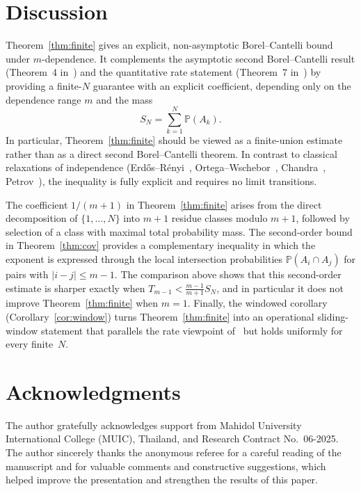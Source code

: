 \documentclass[11pt]{article}
\begin{document}
\section{Discussion}
Theorem~\ref{thm:finite} gives an explicit, non-asymptotic Borel--Cantelli
bound under $m$-dependence.  It complements the asymptotic second
Borel--Cantelli result (Theorem~4 in~\cite{LuShiZhao2026}) and the
quantitative rate statement (Theorem~7 in~\cite{LuShiZhao2026}) by
providing a finite-$N$ guarantee with an explicit coefficient,
depending only on the dependence range $m$ and the mass
\[
  S_N=\sum_{k=1}^N \mathbb{P}(A_k).
\]
In particular, Theorem~\ref{thm:finite} should be viewed as a
finite-union estimate rather than as a direct second
Borel--Cantelli theorem.  In contrast to classical relaxations of
independence
(Erd\H{o}s--R\'enyi~\cite{ErdosRenyi1959},
Ortega--Wschebor~\cite{OrtegaWschebor1984}, Chandra~\cite{Chandra1999},
Petrov~\cite{Petrov2002}), the inequality is fully explicit and
requires no limit transitions.

The coefficient \(1/(m+1)\) in Theorem~\ref{thm:finite} arises from the
direct decomposition of \(\{1,\dots,N\}\) into \(m+1\) residue classes
modulo \(m+1\), followed by selection of a class with maximal total
probability mass.  The second-order bound in Theorem~\ref{thm:cov}
provides a complementary inequality in which the exponent is expressed
through the local intersection probabilities \(\mathbb{P}(A_i\cap A_j)\)
for pairs with \(|i-j|\le m-1\).  The comparison above shows that this
second-order estimate is sharper exactly when
\(T_{m-1}<\frac{m-1}{m+1}S_N\), and in particular it does not improve
Theorem~\ref{thm:finite} when \(m=1\).  Finally, the windowed corollary
(Corollary~\ref{cor:window}) turns Theorem~\ref{thm:finite} into an
operational sliding-window statement that parallels the rate viewpoint
of~\cite{LuShiZhao2026} but holds uniformly for every finite~$N$.


\section*{Acknowledgments}
The author gratefully acknowledges support from Mahidol University
International College (MUIC), Thailand, and Research Contract No.~06-2025.
The author sincerely thanks the anonymous referee for a careful reading of the manuscript and for valuable comments and constructive suggestions, which helped improve the presentation and strengthen the results of this paper.
\end{document}
